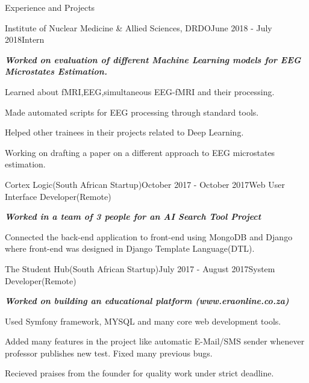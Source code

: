 \documentclass{resume} %
\begin{document}
\begin{rSection}{Experience and Projects}

\begin{rSubsection}{Institute of Nuclear Medicine \& Allied Sciences, DRDO}{June 2018 - July 2018}{Intern}{}
\item {\em \bf Worked on evaluation of different Machine Learning models for EEG Microstates Estimation.}
\item Learned about fMRI,EEG,simultaneous EEG-fMRI and their processing.
\item Made automated scripts for EEG processing through standard tools. 
\item Helped other trainees in their projects related to Deep Learning.
\item Working on drafting a paper on a different approach to EEG microstates estimation.
\end{rSubsection}

\begin{rSubsection}{Cortex Logic(South African Startup)}{October 2017 - October 2017}{Web User Interface Developer(Remote)}{}
\item {\em \bf Worked in a team of 3 people for an AI Search Tool Project}
\item Connected the back-end application to front-end using MongoDB and Django where front-end was designed in Django Template Language(DTL).
\end{rSubsection}


\begin{rSubsection}{The Student Hub(South African Startup)}{July 2017 - August 2017}{System Developer(Remote)}{}
	\item {\em \bf Worked on building an educational platform (www.eraonline.co.za)}
	\item Used Symfony framework, MYSQL and many core web development tools.
	\item Added many features in the project like automatic E-Mail/SMS sender
	whenever professor publishes new test. Fixed many previous bugs.
	\item Recieved praises from the founder for quality work under strict deadline.
\\	
\end{rSubsection}

\end{rSection}
\end{document}
